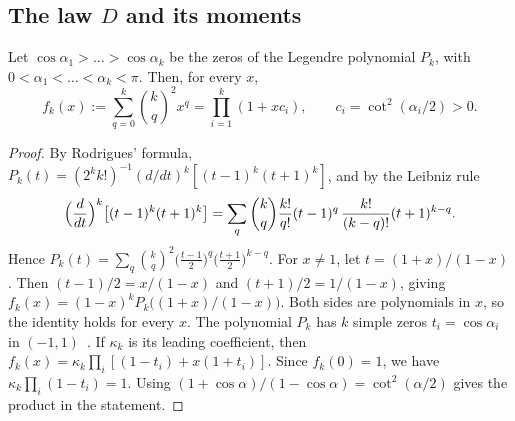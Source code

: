 \subsection{The law \texorpdfstring{$D$}{D} and its moments}

\begin{lema}[Legendre]\label{lem:torres-legendre}
Let $\cos\alpha_1>\dots>\cos\alpha_k$ be the zeros of the Legendre polynomial $P_k$, with
$0<\alpha_1<\dots<\alpha_k<\pi$. Then, for every $x$,
\[
 f_k(x):=\sum_{q=0}^k\binom kq^2x^q=\prod_{i=1}^k(1+xc_i),\qquad c_i=\cot^2(\alpha_i/2)>0.
\]
\end{lema}
\begin{proof}
By Rodrigues' formula, $P_k(t)=(2^kk!)^{-1}(d/dt)^k[(t-1)^k(t+1)^k]$, and by the Leibniz rule
\[
 \Bigl(\frac{d}{dt}\Bigr)^k\bigl[(t-1)^k(t+1)^k\bigr]
 =\sum_q\binom kq\frac{k!}{q!}(t-1)^q\,\frac{k!}{(k-q)!}(t+1)^{k-q}.
\]
Hence $P_k(t)=\sum_q\binom kq^2\bigl(\frac{t-1}2\bigr)^q\bigl(\frac{t+1}2\bigr)^{k-q}$. For $x\ne1$, let
$t=(1+x)/(1-x)$. Then $(t-1)/2=x/(1-x)$ and $(t+1)/2=1/(1-x)$, giving
$f_k(x)=(1-x)^kP_k\bigl((1+x)/(1-x)\bigr)$. Both sides are polynomials in $x$, so the identity holds
for every $x$. The polynomial $P_k$ has $k$ simple zeros $t_i=\cos\alpha_i$ in
$(-1,1)$~\cite[Theorem~3.3.1]{Szego}. If
$\kappa_k$ is its leading coefficient, then $f_k(x)=\kappa_k\prod_i[(1-t_i)+x(1+t_i)]$. Since $f_k(0)=1$, we
have $\kappa_k\prod_i(1-t_i)=1$. Using $(1+\cos\alpha)/(1-\cos\alpha)=\cot^2(\alpha/2)$ gives the product
in the statement.
\end{proof}

